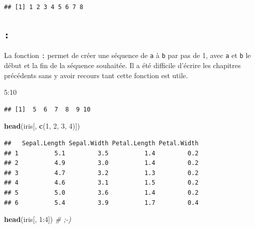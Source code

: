 \documentclass[twoside,symmetric]{book}
\newenvironment{Shaded}{}{}
\newcommand{\CommentTok}[1]{\textit{#1}}
\newcommand{\DecValTok}[1]{#1}
\newcommand{\KeywordTok}[1]{\textbf{#1}}
\newcommand{\NormalTok}[1]{#1}
\newcommand{\OperatorTok}[1]{#1}
\begin{document}
\begin{verbatim}
## [1] 1 2 3 4 5 6 7 8
\end{verbatim}

\hypertarget{l0152points}{%
\subsection{\texorpdfstring{\texttt{:}}{:}}\label{l0152points}}

La fonction \texttt{:} permet de créer une séquence de \texttt{a} à \texttt{b} par pas de 1, avec \texttt{a} et \texttt{b} le début et la fin de la séquence souhaitée. Il a été difficile d'écrire les chapitres précédents sans y avoir recours tant cette fonction est utile.

\begin{Shaded}
\begin{Highlighting}[]
\DecValTok{5}\OperatorTok{:}\DecValTok{10}
\end{Highlighting}
\end{Shaded}

\begin{verbatim}
## [1]  5  6  7  8  9 10
\end{verbatim}

\begin{Shaded}
\begin{Highlighting}[]
\KeywordTok{head}\NormalTok{(iris[, }\KeywordTok{c}\NormalTok{(}\DecValTok{1}\NormalTok{, }\DecValTok{2}\NormalTok{, }\DecValTok{3}\NormalTok{, }\DecValTok{4}\NormalTok{)])}
\end{Highlighting}
\end{Shaded}

\begin{verbatim}
##   Sepal.Length Sepal.Width Petal.Length Petal.Width
## 1          5.1         3.5          1.4         0.2
## 2          4.9         3.0          1.4         0.2
## 3          4.7         3.2          1.3         0.2
## 4          4.6         3.1          1.5         0.2
## 5          5.0         3.6          1.4         0.2
## 6          5.4         3.9          1.7         0.4
\end{verbatim}

\begin{Shaded}
\begin{Highlighting}[]
\KeywordTok{head}\NormalTok{(iris[, }\DecValTok{1}\OperatorTok{:}\DecValTok{4}\NormalTok{]) }\CommentTok{# ;-)}
\end{Highlighting}
\end{Shaded}
\end{document}
